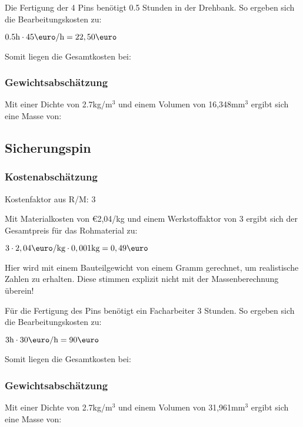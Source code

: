 \documentclass[10pt, a4paper]{article}
\begin{document}
Die Fertigung der 4 Pins benötigt 0.5 Stunden in der Drehbank. So ergeben sich die Bearbeitungskosten zu:
\begin{center}
  $0.5\text{h} \cdot 45\text{\euro/h}= 22,50\text{\euro}$
\end{center}
Somit liegen die Gesamtkosten bei:
\begin{flushright}
\end{flushright}
\subsubsection{Gewichtsabschätzung}
Mit einer Dichte von 2.7kg/m$^3$ und einem Volumen von 16,348mm$^3$ ergibt sich eine Masse von:
\begin{flushright}
\end{flushright}

\newpage
\subsection{Sicherungspin}
\begin{figure}[h]
  \centering
  \vspace{-10pt}
\end{figure}
\subsubsection{Kostenabschätzung}
\begin{center}
  Kostenfaktor aus R/M: 3
\end{center}
Mit Materialkosten von \euro2,04/kg und einem Werkstoffaktor von 3 ergibt sich der Gesamtpreis für das Rohmaterial zu: 
\begin{center}
    $3 \cdot 2,04\text{\euro/kg} \cdot 0,001\text{kg} = 0,49\text{\euro}$
\end{center}
Hier wird mit einem Bauteilgewicht von einem Gramm gerechnet, um realistische Zahlen zu erhalten. Diese stimmen explizit nicht mit der Massenberechnung überein!

Für die Fertigung des Pins benötigt ein Facharbeiter 3 Stunden. So ergeben sich die Bearbeitungskosten zu:
\begin{center}
  $3\text{h} \cdot 30\text{\euro/h}= 90\text{\euro}$
\end{center}
Somit liegen die Gesamtkosten bei:
\begin{flushright}
\end{flushright}
\subsubsection{Gewichtsabschätzung}
Mit einer Dichte von 2.7kg/m$^3$ und einem Volumen von 31,961mm$^3$ ergibt sich eine Masse von:
\begin{flushright}
\end{flushright}
\end{document}
